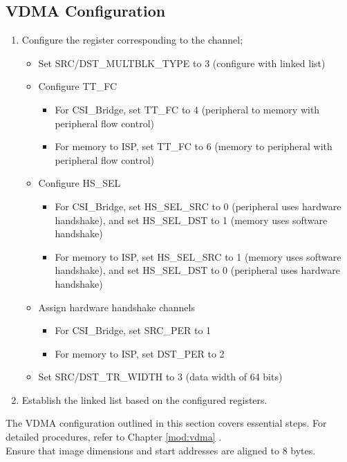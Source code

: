 \documentclass[main\_\_EN.tex]{subfiles}
\begin{document}
\subsection{VDMA Configuration}
\label{sec:isp_vdma_proc}
\begin{enumerate}
    \item Configure the register corresponding to the channel;
    \begin{itemize}
        \item Set SRC/DST\_MULTBLK\_TYPE to 3 (configure with linked list)
        \item Configure TT\_FC
        \begin{itemize}
            \item For CSI\_Bridge, set TT\_FC to 4 (peripheral to memory with peripheral flow control)
            \item For memory to ISP, set TT\_FC to 6 (memory to peripheral with peripheral flow control)
        \end{itemize}
        \item Configure HS\_SEL
        \begin{itemize}
            \item For CSI\_Bridge, set HS\_SEL\_SRC to 0 (peripheral uses hardware handshake), and set HS\_SEL\_DST to 1 (memory uses software handshake)
            \item For memory to ISP, set HS\_SEL\_SRC to 1 (memory uses software handshake), and set HS\_SEL\_DST to 0 (peripheral uses hardware handshake)
        \end{itemize}
        \item Assign hardware handshake channels
        \begin{itemize}
            \item For CSI\_Bridge, set SRC\_PER to 1
            \item For memory to ISP, set DST\_PER to 2
        \end{itemize}
        \item Set SRC/DST\_TR\_WIDTH to 3 (data width of 64 bits)
    \end{itemize}

    \item Establish the linked list based on the configured registers.
\end{enumerate}

\begin{tiplisting}
    The VDMA configuration outlined in this section covers essential steps. For detailed procedures, refer to Chapter \ref{mod:vdma} \textit{}.\\ Ensure that image dimensions and start addresses are aligned to 8 bytes.
\end{tiplisting}
\end{document}
